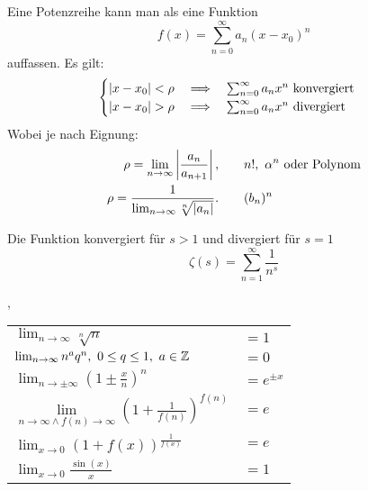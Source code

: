 \Bsp[Potenzreihe] Eine Potenzreihe kann man als eine Funktion 
\[
f(x)=\sum_{n=0}^\infty a_n
(x-x_0)^n
\]
auffassen. Es gilt:
\[
\begin{cases}
\left\lvert x-x_0 \right\rvert< \rho \quad \Longrightarrow \quad \sum_{n=0}^\infty a_nx^n \text{
konvergiert}\\
\left\lvert x-x_0 \right\rvert> \rho \quad \Longrightarrow \quad \sum_{n=0}^\infty a_nx^n \text{
divergiert}\\
\end{cases}
\]
Wobei je nach Eignung: 
\begin{align*}
\rho = \lim_{n\to\infty} \abs{\frac{a_n}{a_{n+1}}}, &\qquad n!, \ \alpha^{n}
\text{ oder Polynom}\\
\rho = \frac{1}{\lim_{n\to\infty}\sqrt[n]{\abs{a_n}}}. &\qquad(b_n)^n
\end{align*}



 Die Funktion konvergiert für $s>1$ und divergiert für $s=1$
$$\zeta(s)=\sum_{n=1}^{\infty} \frac{1}{n^{s}}$$

\sep
\begin{table}[H]
\centering
\begin{tabular}{p{4.5cm}p{1cm}}
$\lim_{n \rightarrow \infty} \sqrt[n]{n}$ & $=1$
\\
$\lim_{n \rightarrow \infty} n^{a}q^{n}, \ 0 \leq q \leq 1, \ a \in \mathbb{Z}$ & $=0$
\\
\midrule
$\lim _{n \rightarrow \pm \infty}\left(1 \pm \frac{x}{n}\right)^{n}$&$=e^{\pm x}$
\\
$\lim \limits_{n \rightarrow \infty \land f(n) \rightarrow \infty}\left(1+\frac{1}{f(n)}\right)^{f(n)}$ & $=e$
\\
$\lim _{x \rightarrow 0}(1+f(x))^{\frac{1}{f(x)}}$ & $=e$
\\
\midrule
$\lim _{x \rightarrow 0} \frac{\sin (x)}{x}$&$=1$
\end{tabular}
\end{table}